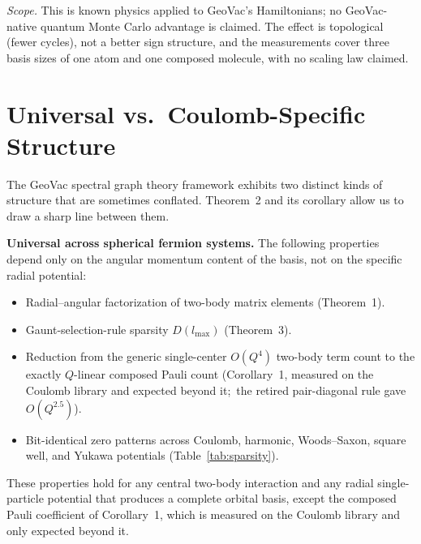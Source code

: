 \documentclass[twocolumn,pra,amsmath,amssymb,superscriptaddress]{revtex4-2}
\begin{document}
\textit{Scope.}  This is known physics applied to GeoVac's
Hamiltonians; no GeoVac-native quantum Monte Carlo advantage is
claimed.  The effect is topological (fewer cycles), not a better sign
structure, and the measurements cover three basis sizes of one atom
and one composed molecule, with no scaling law claimed.

\section{Universal vs.\ Coulomb-Specific Structure}
\label{sec:universal}

The GeoVac spectral graph theory framework exhibits two distinct
kinds of structure that are sometimes conflated.  Theorem~2 and its
corollary allow us to draw a sharp line between them.

\medskip
\noindent\textbf{Universal across spherical fermion systems.}
The following properties depend only on the angular momentum
content of the basis, not on the specific radial potential:
\begin{itemize}
\item Radial--angular factorization of two-body matrix elements
  (Theorem~1).
\item Gaunt-selection-rule sparsity $D(l_{\max})$ (Theorem~3).
\item Reduction from the generic single-center $O(Q^4)$ two-body
  term count to the exactly $Q$-linear composed Pauli count
  (Corollary~1, measured on the Coulomb library and expected beyond
  it;\ the retired pair-diagonal rule gave $O(Q^{2.5})$).
\item Bit-identical zero patterns across Coulomb, harmonic,
  Woods--Saxon, square well, and Yukawa potentials
  (Table~\ref{tab:sparsity}).
\end{itemize}
These properties hold for any central two-body interaction and any
radial single-particle potential that produces a complete orbital
basis, except the composed Pauli coefficient of Corollary~1, which is
measured on the Coulomb library and only expected beyond it.
\end{document}
